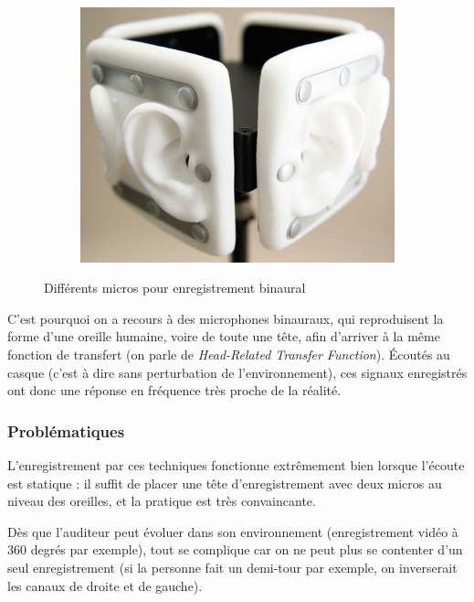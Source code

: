 \documentclass[a4,12pt]{scrartcl}
\begin{document}
\begin{figure}[!h]
\begin{subfigure}{.3\linewidth}
	\end{subfigure}
 	~
	\begin{subfigure}{.3\linewidth}
	  \centering
	  \includegraphics[width=\linewidth]{freespace-omni}
	\end{subfigure}
 	\caption{Différents micros pour enregistrement binaural}
 	\label{binaural}
\end{figure}

C'est pourquoi on a recours à des microphones binauraux, qui reproduisent la forme d'une oreille humaine, voire de toute une tête, afin d'arriver à la même fonction de transfert (on parle de \emph{Head-Related Transfer Function}). Écoutés au casque (c'est à dire sans perturbation de l'environnement), ces signaux enregistrés ont donc une réponse en fréquence très proche de la réalité.

\subsubsection{Problématiques}

L'enregistrement par ces techniques fonctionne extrêmement bien lorsque l'écoute est statique : il suffit de placer une tête d'enregistrement avec deux micros au niveau des oreilles, et la pratique est très convaincante.

Dès que l'auditeur peut évoluer dans son environnement (enregistrement vidéo à 360 degrés par exemple), tout se complique car on ne peut plus se contenter d'un seul enregistrement (si la personne fait un demi-tour par exemple, on inverserait les canaux de droite et de gauche).
\end{document}
